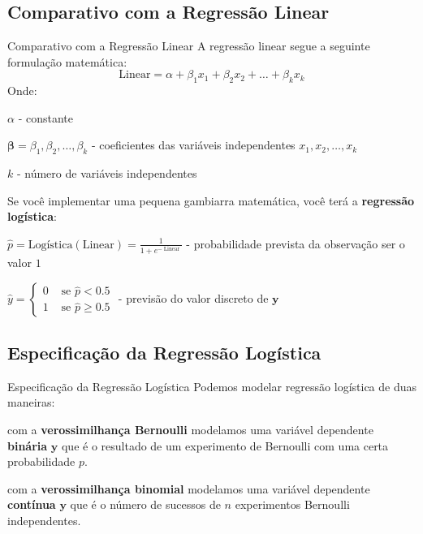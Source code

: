 \subsection{Comparativo com a Regressão Linear}
\begin{frame}{Comparativo com a Regressão Linear}
	A regressão linear segue a seguinte formulação matemática:
	\small
	$$
		\text{Linear} = \alpha + \beta_1 x_1 + \beta_2 x_2 + \dots + \beta_k x_k
	$$
	Onde:
	\begin{vfilleditems}
		\item \small $\alpha$ - constante
		\item \small $\boldsymbol{\beta} = \beta_1, \beta_2, \dots, \beta_k$ - coeficientes das variáveis independentes $x_1, x_2, \dots, x_k$
		\item \small $k$ - número de variáveis independentes
	\end{vfilleditems}
	Se você implementar uma pequena gambiarra matemática, você terá a \textbf{regressão logística}:
	\begin{vfilleditems}
		\item \small $\hat{p} = \text{Logística}(\text{Linear}) = \frac{1}{1 + e^{-\operatorname{Linear}}}$ - probabilidade prevista da observação ser o valor $1$
		\item \small $\hat{y} = \begin{cases} 0 & \text { se } \hat{p} < 0.5 \\ 1 & \text { se } \hat{p} \geq 0.5 \end{cases}$ - previsão do valor discreto de $\boldsymbol{y}$
	\end{vfilleditems}
\end{frame}

\subsection{Especificação da Regressão Logística}
\begin{frame}{Especificação da Regressão Logística}
	Podemos modelar regressão logística de duas maneiras:
	\begin{vfilleditems}
		\item com a \textbf{verossimilhança Bernoulli} modelamos uma variável dependente
		\textbf{binária} $\boldsymbol{y}$ que é o resultado de um experimento de
		Bernoulli com uma certa probabilidade $p$.
		\item com a \textbf{verossimilhança binomial} modelamos uma variável dependente
		\textbf{contínua} $\boldsymbol{y}$ que é o número de sucessos de $n$
		experimentos Bernoulli independentes.
	\end{vfilleditems}
\end{frame}


